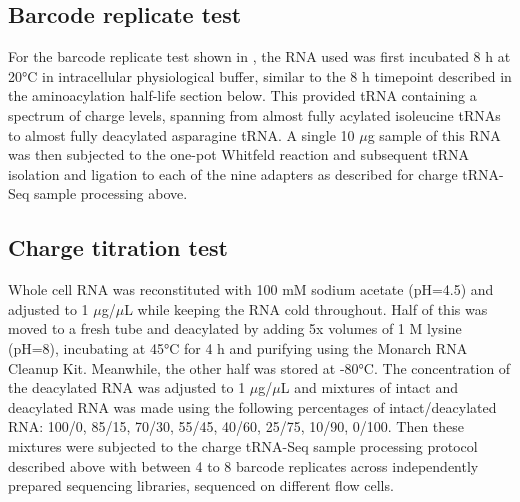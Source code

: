 \documentclass[9pt,lineno]{elife}
\begin{document}
\subsection{Barcode replicate test}
For the barcode replicate test shown in , the RNA used was first incubated 8 h at 20°C in intracellular physiological buffer, similar to the 8 h timepoint described in the aminoacylation half-life section below.
This provided tRNA containing a spectrum of charge levels, spanning from almost fully acylated isoleucine tRNAs to almost fully deacylated asparagine tRNA.
A single 10 $\mu$g sample of this RNA was then subjected to the one-pot Whitfeld reaction and subsequent tRNA isolation and ligation to each of the nine adapters as described for charge tRNA-Seq sample processing above.



\subsection{Charge titration test}
Whole cell RNA was reconstituted with 100 mM sodium acetate (pH=4.5) and adjusted to 1 $\mu$g/$\mu$L while keeping the RNA cold throughout.
Half of this was moved to a fresh tube and deacylated by adding 5x volumes of 1 M lysine (pH=8), incubating at 45°C for 4 h and purifying using the Monarch RNA Cleanup Kit.
Meanwhile, the other half was stored at -80°C.
The concentration of the deacylated RNA was adjusted to 1 $\mu$g/$\mu$L and mixtures of intact and deacylated RNA was made using the following percentages of intact/deacylated RNA: 100/0, 85/15, 70/30, 55/45, 40/60, 25/75, 10/90, 0/100.
Then these mixtures were subjected to the charge tRNA-Seq sample processing protocol described above with between 4 to 8 barcode replicates across independently prepared sequencing libraries, sequenced on different flow cells.
\end{document}
